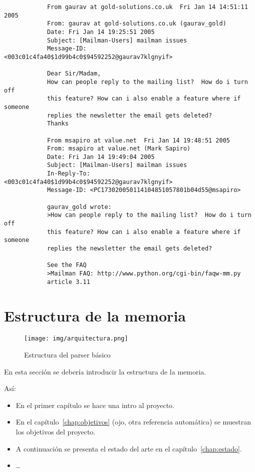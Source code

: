 \documentclass[a4paper, 12pt]{book}
\begin{document}
	
	{\footnotesize
		\begin{verbatim}
			From gaurav at gold-solutions.co.uk  Fri Jan 14 14:51:11 2005
			From: gaurav at gold-solutions.co.uk (gaurav_gold)
			Date: Fri Jan 14 19:25:51 2005
			Subject: [Mailman-Users] mailman issues
			Message-ID: <003c01c4fa40$1d99b4c0$94592252@gaurav7klgnyif>
			
			Dear Sir/Madam,
			How can people reply to the mailing list?  How do i turn off
			this feature? How can i also enable a feature where if someone
			replies the newsletter the email gets deleted?
			Thanks
			
			From msapiro at value.net  Fri Jan 14 19:48:51 2005
			From: msapiro at value.net (Mark Sapiro)
			Date: Fri Jan 14 19:49:04 2005
			Subject: [Mailman-Users] mailman issues
			In-Reply-To: <003c01c4fa40$1d99b4c0$94592252@gaurav7klgnyif>
			Message-ID: <PC173020050114104851057801b04d55@msapiro>
			
			gaurav_gold wrote:
			>How can people reply to the mailing list?  How do i turn off
			this feature? How can i also enable a feature where if someone
			replies the newsletter the email gets deleted?
			
			See the FAQ
			>Mailman FAQ: http://www.python.org/cgi-bin/faqw-mm.py
			article 3.11
		\end{verbatim}
	}
	
	
	
	\section{Estructura de la memoria}
	\label{sec:estructura}
	
	
	\begin{figure}
		\centering
		\texttt{[image: img/arquitectura.png]}
		\caption{Estructura del parser básico}
		\label{fig:arquitectura}
	\end{figure}
	
	
	
	
	En esta sección se debería introducir la estructura de la memoria. 
	
	Así:
	
	
	\begin{itemize}
		\item En el primer capítulo se hace una intro al proyecto.
		
		\item En el capítulo~\ref{chap:objetivos} (ojo, otra referencia automática) se muestran los objetivos del proyecto.
		
		\item A continuación se presenta el estado del arte en el capítulo~\ref{chap:estado}.
		
		\item \ldots
	\end{itemize}
	
\end{document}
